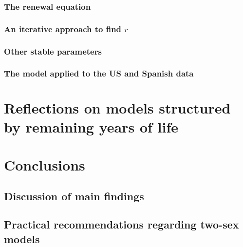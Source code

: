     \subsection{The renewal equation}
      
    \subsection{An iterative approach to find $r$}
      
    \subsection{Other stable parameters}
      
    \subsection{The model applied to the US and Spanish data}
      
  \chapter{Reflections on models structured by remaining years of life}
     
  
  \chapter{Conclusions}
    
    \section{Discussion of main findings}
      
    \section{Practical recommendations regarding two-sex models}
      
